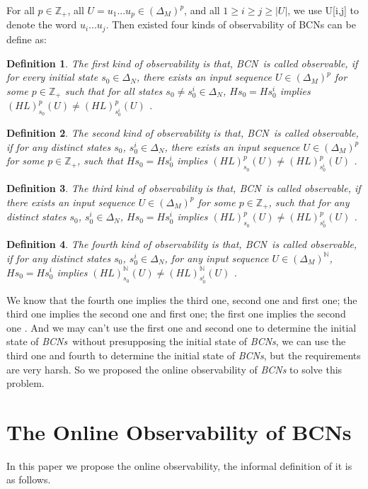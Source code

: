 \documentclass[conference]{IEEEtran} %
\newtheorem{definition}{Definition}
\def \BCN {{\em BCN}}
\def \BCNs {{\em BCNs}}
\begin{document}
For all  $p\in \mathbb{Z}_+$, all $U=u_1 ... u_p \in(\Delta_M)^p$, and all $1\ge i \ge j \ge |U|$, we use U[i,j] to denote the word $u_i ... u_j$. Then existed four kinds of observability of BCNs can be define as: 
\begin{definition}
The first kind of observability is that, \BCN\ is called observable, if for every initial state $s_0 \in \Delta_N$, there exists an input sequence $U\in(\Delta_M)^p$ for some $p\in \mathbb{Z}_+$ such that for all states $s_0\neq s^i_0\in \Delta_N$, $Hs_0=Hs^i_0$ implies $(HL)^p_{s_0}(U)\neq (HL)^p_{s^i_0}(U)$ \cite{cheng2009controllability}.
\end{definition}
\begin{definition}
	The second kind of observability is that, \BCN\ is called observable, if for any distinct states $s_0$, $s^i_0 \in \Delta_N$, there exists an input sequence $U\in(\Delta_M)^p$ for some $p\in \mathbb{Z}_+$, such that $Hs_0=Hs^i_0$ implies $(HL)^p_{s_0}(U)\neq (HL)^p_{s^i_0}(U)$ \cite{Zhao2010Input}.
\end{definition}
\begin{definition}
	The third kind of observability is that, \BCN\ is called observable, if there exists an input sequence $U\in(\Delta_M)^p$ for some $p\in \mathbb{Z}_+$, such that for any distinct states $s_0$, $s^i_0 \in \Delta_N$, $Hs_0=Hs^i_0$ implies $(HL)^p_{s_0}(U)\neq (HL)^p_{s^i_0}(U)$ \cite{Cheng2011Identification}.
\end{definition}
\begin{definition}
	The fourth kind of observability is that, \BCN\ is called observable, if for any distinct states $s_0$, $s^i_0 \in \Delta_N$, for any input sequence $U\in(\Delta_M)^{\mathbb{N}}$, $Hs_0=Hs^i_0$ implies $(HL)^{\mathbb{N}}_{s_0}(U)\neq (HL)^{\mathbb{N}}_{s^i_0}(U)$ \cite{Fornasini2013Observability}.
\end{definition}

We know that the fourth one implies the third one, second one and first one; the third one implies the second one and first one; the first one implies the second one \cite{Zhang2016Observability}.  And we may can't use the first one and second one to determine the initial state of \BCNs\ without presupposing the initial state of {\em BCNs}, we can use the third one and fourth to determine the initial state of {\em BCNs}, but the requirements are very harsh. So we proposed the online observability of {\em BCNs} to solve this problem.
\section{The Online Observability of BCNs}
In this paper we propose the online observability, the informal definition of it is as follows. 
\end{document}
